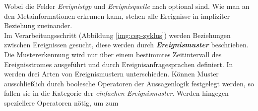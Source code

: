 \documentclass{acm_proc_article-sp}
\begin{document}
\begin{table}[ht]
    \caption{Ereignisaufbau}
    \label{table:ereignis}\vspace{0.2cm}
\end{table}
Wobei die Felder \textit{Ereignistyp} und \textit{Ereignisquelle} nach \cite{bruns} 
optional sind. Wie man an den Metainformationen erkennen kann, stehen alle Ereignisse in 
impliziter Beziehung zueinander.\\
Im Verarbeitungsschritt (Abbildung \ref{img:cep-zyklus}) werden Beziehungen zwischen 
Ereignissen gesucht, diese werden durch \textbf{\textit{Ereignismuster}} beschrieben. Die 
Mustererkennung wird nur über einem bestimmtes Zeitintervall des Ereignisstromes 
ausgeführt und durch Ereignisanfragesprachen definiert. In \cite{bruns} werden drei Arten 
von Ereignismustern unterschieden. Können Muster ausschließlich durch boolesche 
Operatoren der Aussagenlogik festgelegt werden, so fallen sie in die Kategorie der 
\textit{einfachen Ereignismuster}. Werden hingegen speziellere Operatoren nötig, um zum 
\end{document}
